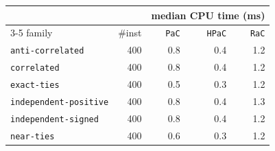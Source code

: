 \begin{tabular}{@{}lrrrr@{}}
\toprule
 &  & \multicolumn{3}{c}{median CPU time (ms)} \\
\cmidrule(l){3-5}
family & \#inst & \texttt{PaC} & \texttt{HPaC} & \texttt{RaC} \\
\midrule
\texttt{anti-correlated} & 400 & 0.8 & 0.4 & 1.2 \\
\texttt{correlated} & 400 & 0.8 & 0.4 & 1.2 \\
\texttt{exact-ties} & 400 & 0.5 & 0.3 & 1.2 \\
\texttt{independent-positive} & 400 & 0.8 & 0.4 & 1.3 \\
\texttt{independent-signed} & 400 & 0.8 & 0.4 & 1.2 \\
\texttt{near-ties} & 400 & 0.6 & 0.3 & 1.2 \\
\bottomrule
\end{tabular}
